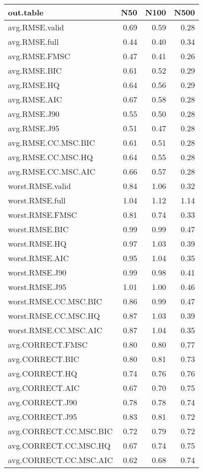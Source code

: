 %
\begin{table}[!tbp]
 \begin{center}
 \begin{tabular}{lrrr}\hline\hline
\multicolumn{1}{l}{out.table}&\multicolumn{1}{c}{N50}&\multicolumn{1}{c}{N100}&\multicolumn{1}{c}{N500}\tabularnewline
\hline
avg.RMSE.valid&0.69&0.59&0.28\tabularnewline
avg.RMSE.full&0.44&0.40&0.34\tabularnewline
avg.RMSE.FMSC&0.47&0.41&0.26\tabularnewline
avg.RMSE.BIC&0.61&0.52&0.29\tabularnewline
avg.RMSE.HQ&0.64&0.56&0.29\tabularnewline
avg.RMSE.AIC&0.67&0.58&0.28\tabularnewline
avg.RMSE.J90&0.55&0.50&0.28\tabularnewline
avg.RMSE.J95&0.51&0.47&0.28\tabularnewline
avg.RMSE.CC.MSC.BIC&0.61&0.51&0.28\tabularnewline
avg.RMSE.CC.MSC.HQ&0.64&0.55&0.28\tabularnewline
avg.RMSE.CC.MSC.AIC&0.66&0.57&0.28\tabularnewline
worst.RMSE.valid&0.84&1.06&0.32\tabularnewline
worst.RMSE.full&1.04&1.12&1.14\tabularnewline
worst.RMSE.FMSC&0.81&0.74&0.33\tabularnewline
worst.RMSE.BIC&0.99&0.99&0.47\tabularnewline
worst.RMSE.HQ&0.97&1.03&0.39\tabularnewline
worst.RMSE.AIC&0.95&1.04&0.35\tabularnewline
worst.RMSE.J90&0.99&0.98&0.41\tabularnewline
worst.RMSE.J95&1.01&1.00&0.46\tabularnewline
worst.RMSE.CC.MSC.BIC&0.86&0.99&0.47\tabularnewline
worst.RMSE.CC.MSC.HQ&0.87&1.03&0.39\tabularnewline
worst.RMSE.CC.MSC.AIC&0.87&1.04&0.35\tabularnewline
avg.CORRECT.FMSC&0.80&0.80&0.77\tabularnewline
avg.CORRECT.BIC&0.80&0.81&0.73\tabularnewline
avg.CORRECT.HQ&0.74&0.76&0.76\tabularnewline
avg.CORRECT.AIC&0.67&0.70&0.75\tabularnewline
avg.CORRECT.J90&0.78&0.78&0.74\tabularnewline
avg.CORRECT.J95&0.83&0.81&0.72\tabularnewline
avg.CORRECT.CC.MSC.BIC&0.72&0.79&0.72\tabularnewline
avg.CORRECT.CC.MSC.HQ&0.67&0.74&0.75\tabularnewline
avg.CORRECT.CC.MSC.AIC&0.62&0.68&0.74\tabularnewline
\hline
\end{tabular}

\end{center}

\end{table}

